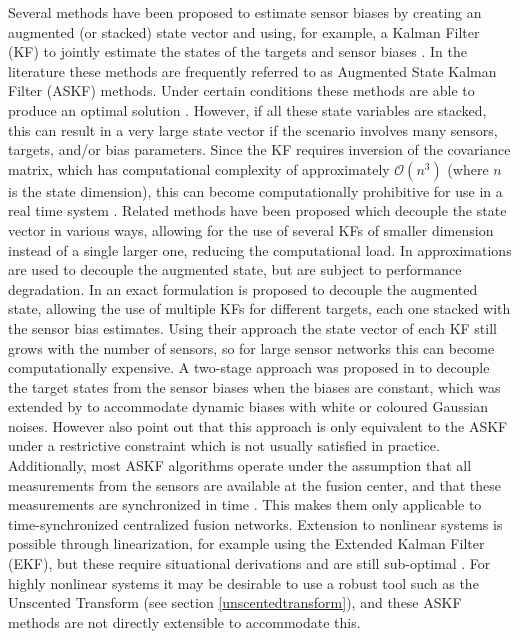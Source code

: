 \documentclass[journal]{IEEEtran}
\begin{document}
Several methods have been proposed to estimate sensor biases by creating an augmented (or stacked) state vector and using, for example, a Kalman Filter (KF) to jointly estimate the states of the targets and sensor biases \cite{van1993systematic, friedland1969treatment, yi2019exactly}. In the literature these methods are frequently referred to as Augmented State Kalman Filter (ASKF) methods. Under certain conditions these methods are able to produce an optimal solution \cite{van1993systematic, yi2019exactly}. However, if all these state variables are stacked, this can result in a very large state vector if the scenario involves many sensors, targets, and/or bias parameters. Since the KF requires inversion of the covariance matrix, which has computational complexity of approximately $\mathcal{O}(n^3)$ (where $n$ is the state dimension), this can become computationally prohibitive for use in a real time system \cite{van1993systematic}. Related methods have been proposed which decouple the state vector in various ways, allowing for the use of several KFs of smaller dimension instead of a single larger one, reducing the computational load. In \cite{van1993systematic, kastella2000bias} approximations are used to decouple the augmented state, but are subject to performance degradation. In \cite{yi2019exactly} an exact formulation is proposed to decouple the augmented state, allowing the use of multiple KFs for different targets, each one stacked with the sensor bias estimates. Using their approach the state vector of each KF still grows with the number of sensors, so for large sensor networks this can become computationally expensive. A two-stage approach was proposed in \cite{friedland1969treatment} to decouple the target states from the sensor biases when the biases are constant, which was extended by \cite{alouani1992two} to accommodate dynamic biases with white or coloured Gaussian noises. However \cite{alouani1992two} also point out that this approach is only equivalent to the ASKF under a restrictive constraint which is not usually satisfied in practice. Additionally, most ASKF algorithms operate under the assumption that all measurements from the sensors are available at the fusion center, and that these measurements are synchronized in time \cite{van1993systematic, yi2019exactly, alouani1992two}. This makes them only applicable to time-synchronized centralized fusion networks. Extension to nonlinear systems is possible through linearization, for example using the Extended Kalman Filter (EKF), but these require situational derivations and are still sub-optimal \cite{bar2004estimation}. For highly nonlinear systems it may be desirable to use a robust tool such as the Unscented Transform (see section \ref{unscentedtransform}), and these ASKF methods are not directly extensible to accommodate this.
\end{document}
